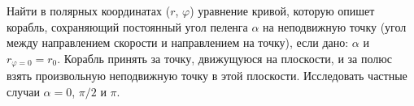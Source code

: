 Найти в полярных координатах ($r$, $\varphi$) уравнение кривой,
которую опишет корабль, сохраняющий постоянный угол пеленга $\alpha$
на неподвижную точку (угол между направлением скорости и направлением на точку),
если дано: $\alpha$ и $r_{\varphi = 0} = r_0$.
Корабль принять за точку, движущуюся на плоскости,
и за полюс взять произвольную неподвижную точку в этой плоскости.
Исследовать частные случаи $\alpha = 0$, $\pi/2$ и $\pi$.
